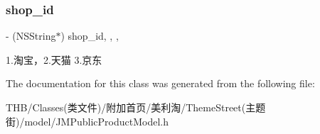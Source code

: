 \subsubsection{\texorpdfstring{shop\+\_\+id}{shop\_id}}
{\footnotesize\ttfamily -\/ (N\+S\+String$\ast$) shop\+\_\+id\hspace{0.3cm}{\ttfamily [read]}, {\ttfamily [write]}, {\ttfamily [nonatomic]}, {\ttfamily [copy]}}

1.淘宝，2.\+天猫 3.京东 

The documentation for this class was generated from the following file\+:\begin{DoxyCompactItemize}
\item 
T\+H\+B/\+Classes(类文件)/附加首页/美利淘/\+Theme\+Street(主题街)/model/J\+M\+Public\+Product\+Model.\+h\end{DoxyCompactItemize}
